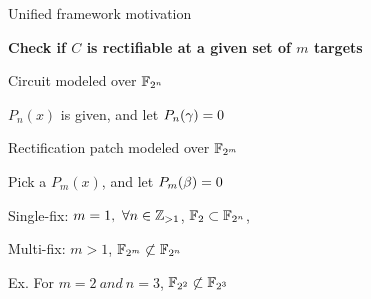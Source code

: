 \begin{frame}{\large Unified framework motivation}
\bi
	\item {\bf Check if $C$ is rectifiable at a given set of $m$ targets }
	\pause
	\vspace{0.1in}
	\item Circuit modeled over ${\mathbb{F}}_{2^n}$ 
	\vspace{0.1in}
	\bi
		\item $P_n(x)$ is given, and let $P_n(\gamma) = 0$
	\ei
	\vspace{0.1in}
	\item Rectification patch modeled over ${\mathbb{F}}_{2^m}$
	\vspace{0.1in}
	\bi
		\item Pick a $P_m(x)$, and let $P_m(\beta) = 0$
	\ei
	\pause 
	\vspace{0.1in}
    \item Single-fix: $m=1,~\forall n \in {\mathbb{Z}}_{>1}$, ${\mathbb{F}}_2 \subset {\mathbb{F}}_{2^n}$, 
	\pause
	\vspace{0.1in}
	\item Multi-fix: $m > 1$, ${\mathbb{F}}_{2^m} \not\subset {\mathbb{F}}_{2^n}$
	\pause
	\bi
		\item Ex. For $m=2~and~n=3$, ${\mathbb{F}}_{2^2} \not\subset {\mathbb{F}}_{2^3}$
	\ei
\ei
\end{frame}


